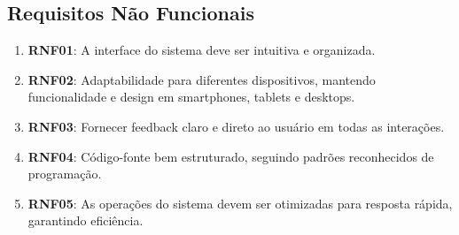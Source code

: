 \subsection{Requisitos Não Funcionais}
\begin{enumerate}
	\item \textbf{RNF01}: A interface do sistema deve ser intuitiva e organizada.
	\item \textbf{RNF02}: Adaptabilidade para diferentes dispositivos, mantendo funcionalidade e design em smartphones, tablets e desktops.
	\item \textbf{RNF03}: Fornecer feedback claro e direto ao usuário em todas as interações.
	\item \textbf{RNF04}: Código-fonte bem estruturado, seguindo padrões reconhecidos de programação.
	\item \textbf{RNF05}: As operações do sistema devem ser otimizadas para resposta rápida, garantindo eficiência.
\end{enumerate}

